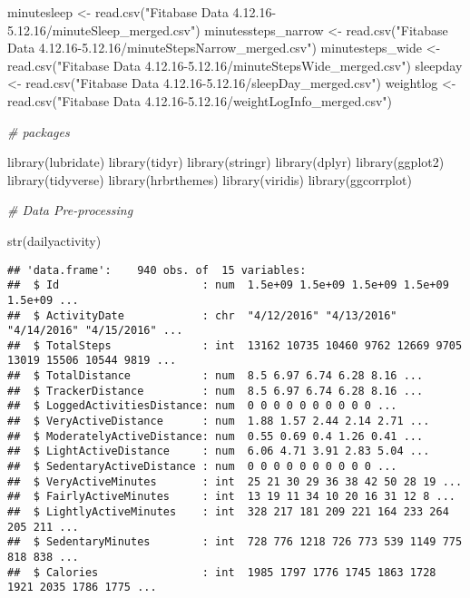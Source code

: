 \documentclass[
]{article}
\newenvironment{Shaded}{\begin{snugshade}}{\end{snugshade}}
\newcommand{\CommentTok}[1]{\textcolor[rgb]{0.56,0.35,0.01}{\textit{#1}}}
\newcommand{\FunctionTok}[1]{\textcolor[rgb]{0.00,0.00,0.00}{#1}}
\newcommand{\NormalTok}[1]{#1}
\newcommand{\OtherTok}[1]{\textcolor[rgb]{0.56,0.35,0.01}{#1}}
\newcommand{\StringTok}[1]{\textcolor[rgb]{0.31,0.60,0.02}{#1}}
\begin{document}
\begin{Shaded}
\begin{Highlighting}[]
\NormalTok{minutesleep }\OtherTok{\textless{}{-}} \FunctionTok{read.csv}\NormalTok{(}\StringTok{"Fitabase Data 4.12.16{-}5.12.16/minuteSleep\_merged.csv"}\NormalTok{)}
\NormalTok{minutessteps\_narrow }\OtherTok{\textless{}{-}} \FunctionTok{read.csv}\NormalTok{(}\StringTok{"Fitabase Data 4.12.16{-}5.12.16/minuteStepsNarrow\_merged.csv"}\NormalTok{)}
\NormalTok{minutesteps\_wide }\OtherTok{\textless{}{-}} \FunctionTok{read.csv}\NormalTok{(}\StringTok{"Fitabase Data 4.12.16{-}5.12.16/minuteStepsWide\_merged.csv"}\NormalTok{)}
\NormalTok{sleepday }\OtherTok{\textless{}{-}} \FunctionTok{read.csv}\NormalTok{(}\StringTok{"Fitabase Data 4.12.16{-}5.12.16/sleepDay\_merged.csv"}\NormalTok{)}
\NormalTok{weightlog }\OtherTok{\textless{}{-}} \FunctionTok{read.csv}\NormalTok{(}\StringTok{"Fitabase Data 4.12.16{-}5.12.16/weightLogInfo\_merged.csv"}\NormalTok{)}

\CommentTok{\# packages}

\FunctionTok{library}\NormalTok{(lubridate)}
\FunctionTok{library}\NormalTok{(tidyr)}
\FunctionTok{library}\NormalTok{(stringr)}
\FunctionTok{library}\NormalTok{(dplyr)}
\FunctionTok{library}\NormalTok{(ggplot2)}
\FunctionTok{library}\NormalTok{(tidyverse)}
\FunctionTok{library}\NormalTok{(hrbrthemes)}
\FunctionTok{library}\NormalTok{(viridis)}
\FunctionTok{library}\NormalTok{(ggcorrplot)}

\CommentTok{\# Data Pre{-}processing }

\FunctionTok{str}\NormalTok{(dailyactivity)}
\end{Highlighting}
\end{Shaded}

\begin{verbatim}
## 'data.frame':    940 obs. of  15 variables:
##  $ Id                      : num  1.5e+09 1.5e+09 1.5e+09 1.5e+09 1.5e+09 ...
##  $ ActivityDate            : chr  "4/12/2016" "4/13/2016" "4/14/2016" "4/15/2016" ...
##  $ TotalSteps              : int  13162 10735 10460 9762 12669 9705 13019 15506 10544 9819 ...
##  $ TotalDistance           : num  8.5 6.97 6.74 6.28 8.16 ...
##  $ TrackerDistance         : num  8.5 6.97 6.74 6.28 8.16 ...
##  $ LoggedActivitiesDistance: num  0 0 0 0 0 0 0 0 0 0 ...
##  $ VeryActiveDistance      : num  1.88 1.57 2.44 2.14 2.71 ...
##  $ ModeratelyActiveDistance: num  0.55 0.69 0.4 1.26 0.41 ...
##  $ LightActiveDistance     : num  6.06 4.71 3.91 2.83 5.04 ...
##  $ SedentaryActiveDistance : num  0 0 0 0 0 0 0 0 0 0 ...
##  $ VeryActiveMinutes       : int  25 21 30 29 36 38 42 50 28 19 ...
##  $ FairlyActiveMinutes     : int  13 19 11 34 10 20 16 31 12 8 ...
##  $ LightlyActiveMinutes    : int  328 217 181 209 221 164 233 264 205 211 ...
##  $ SedentaryMinutes        : int  728 776 1218 726 773 539 1149 775 818 838 ...
##  $ Calories                : int  1985 1797 1776 1745 1863 1728 1921 2035 1786 1775 ...
\end{verbatim}
\end{document}
